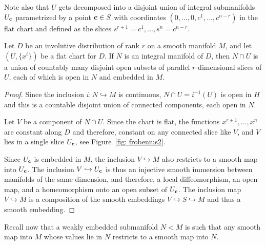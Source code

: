 Note also that $U$ gets decomposed into a disjoint union of integral submanifolds $U_{\bf{c}}$ parametrized by a point $\bf{c}\in S$ with coordinates $(0,\ldots,0,c^1,\ldots,c^{n-r})$ in the flat chart and defined as the slices $s^{r+1}=c^1,\ldots, s^n=c^{n-r}$.

\begin{prop}\label{prop 19.16 Lee}
    Let $D$ be an involutive distribution of rank $r$ on a smooth manifold $M$, and let $(U,\{x^i\})$ be a flat chart for $D$. If $N$ is an integral manifold of $D$, then $N\cap U$ is a union of countably many disjoint open subsets of parallel $r$-dimensional slices of $U$, each of which is open in $N$ and embedded in $M$.
\end{prop}
\begin{proof}
    Since the inclusion $i:N\hookrightarrow M$ is continuous, $N\cap U=i^{-1}(U)$ is open in $H$ and this is a countable disjoint union of connected components, each open in $N$.

    Let $V$ be a component of $N\cap U$. Since the chart is flat, the functions $x^{r+1},\ldots,x^n$ are constant along $D$ and therefore, constant on any connected slice like $V$, and $V$ lies in a single slice $U_{\bf{c}}$, see Figure~\ref{fig: frobenius2}.

    Since $U_{\bf{c}}$ is embedded in $M$, the inclusion $V\hookrightarrow M$ also restricts to a smooth map into $U_{\bf{c}}$. The inclusion $V\hookrightarrow U_{\bf{c}}$ is thus an injective smooth immersion between manifolds of the same dimension, and therefore, a local diffeomorphism, an open map, and a homeomorphism onto an open subset of $U_{\bf{c}}$. The inclusion map $V\hookrightarrow M$ is a composition of the smooth embeddings $V\hookrightarrow S\hookrightarrow M$ and thus a smooth embedding.
\end{proof}

Recall now that a weakly embedded submanifold $N<M$ is such that any smooth map into $M$ whose values lie in $N$ restricts to a smooth map into $N$.

